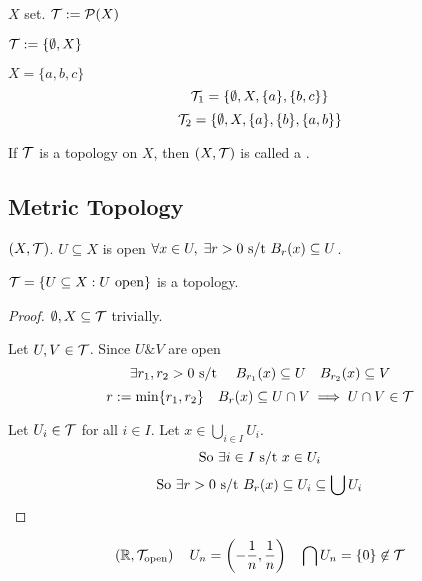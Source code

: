 \documentclass[12pt]{article}
\begin{document}
\bboxexam
\begin{exam}
    \(X\) set. \(\mathcal T:=\mathcal P(X)\)
\end{exam}
\ebox

\bboxexam
\begin{exam}
    \(\mathcal T:=\{\emptyset,X\}\)
\end{exam}
\ebox

\bboxexam
\begin{exam}
    \(X=\{a,b,c\}\)
    \[
        \mathcal T_1=\{\emptyset,X,\{a\},\{b,c\}\}
    \]
    \[
        \mathcal T_2=\{\emptyset,X,\{a\},\{b\},\{a,b\}\}
    \]
\end{exam}
\ebox

\bboxnota
\begin{nota}
    If \(\mathcal T\) is a topology on \(X\), then \((X,\mathcal T)\) is called a
    .
\end{nota}
\ebox

\subsection{Metric Topology}

\bboxdefn
\begin{defn}[Open]
    \((X,\mathcal T)\). \(U\subseteq X\) is open 
    \(\forall x\in U,\;\exists r>0\text{ s/t } B_r(x)\subseteq U\).
\end{defn}
\ebox

\bboxprop
\begin{prop}
    \(\mathcal T=\{U\subseteq X:U\text{ open}\}\) is a topology.
\end{prop}
\ebox

\bboxproof
\begin{proof}
    \(\emptyset,X\subseteq\mathcal T\) trivially.

    Let \(U,V\in\mathcal T\). Since \(U\mathbin{\&}V\) are open
    \[
        \exists r_1,r_2>0\text{ s/t }\quad
        B_{r_1}(x)\subseteq U\quad B_{r_2}(x)\subseteq V
    \]
    \[
        r:=\min\{r_1,r_2\}\quad
        B_r(x)\subseteq U\cap V\implies U\cap V\in\mathcal T
    \]

    Let \(U_i\in\mathcal T\) for all \(i\in I\). Let \(x\in\bigcup_{i\in I}U_i\).
    \[
        \text{So }\exists i\in I\text{ s/t } x\in U_i
    \]
    \[
        \text{So }\exists r>0\text{ s/t } B_r(x)\subseteq U_i\subseteq\bigcup U_i
    \]
\end{proof}
\ebox

\bboxexam
\begin{exam}
    \[
        \left(\mathbb R,\mathcal T_{\mathrm{open}}\right)\quad U_n=\left(-\frac1n,\frac1n\right)
        \quad\bigcap U_n=\{0\}\not\in\mathcal T
    \]
\end{exam}
\ebox
\end{document}
